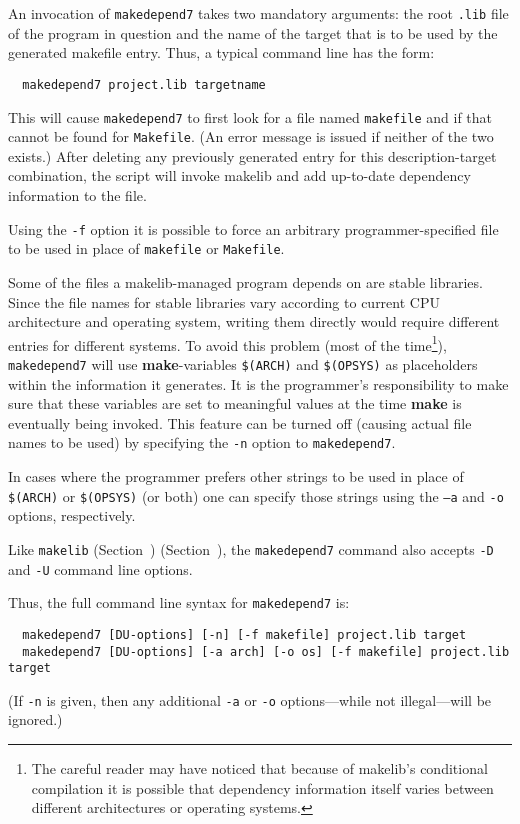 An invocation of {\tt makedepend7} takes two mandatory arguments:
the root {\tt .lib} file of the program in question and the name
of the target that is to be used by the generated makefile entry.
Thus, a typical command line has the form:

\begin{verbatim}
  makedepend7 project.lib targetname
\end{verbatim}

This will cause {\tt makedepend7} to first look for a file named
{\tt makefile} and if that cannot be found for {\tt Makefile}.  (An
error message is issued if neither of the two exists.)  After deleting
any previously generated entry for this description-target
combination, the script will invoke makelib and add up-to-date dependency
information to the file.

Using the {\tt -f} option it is possible to force an arbitrary
programmer-specified file to be used in place of {\tt makefile} or
{\tt Makefile}.

Some of the files a makelib-managed program depends on are stable
libraries.  Since the file names for stable libraries vary according
to current CPU architecture and operating system, writing them
directly would require different entries for different systems.  To
avoid this problem (most of the time\footnote{The careful reader may
have noticed that because of makelib's conditional compilation it is
possible that dependency information itself varies between different
architectures or operating systems.}), {\tt makedepend7} will use
{\bf make}-variables {\tt \$(ARCH)} and {\tt \$(OPSYS)} as
placeholders within the information it generates.  It is the
programmer's responsibility to make sure that these variables are set
to meaningful values at the time {\bf make} is eventually being
invoked.  This feature can be turned off (causing actual file names to
be used) by specifying the {\tt -n} option to {\tt makedepend7}.

In cases where the programmer prefers other strings to be used in
place of {\tt \$(ARCH)} or {\tt \$(OPSYS)} (or both) one can specify
those strings using the {\tt --a} and {\tt -o} options, respectively.

Like {\tt makelib} (Section~)
(Section~), the {\tt makedepend7} command
also accepts {\tt -D} and {\tt -U} command line options.

Thus, the full command line syntax for {\tt makedepend7} is:

\begin{verbatim}
  makedepend7 [DU-options] [-n] [-f makefile] project.lib target
  makedepend7 [DU-options] [-a arch] [-o os] [-f makefile] project.lib target
\end{verbatim}

(If {\tt -n} is given, then any additional {\tt -a} or {\tt -o}
options---while not illegal---will be ignored.)
